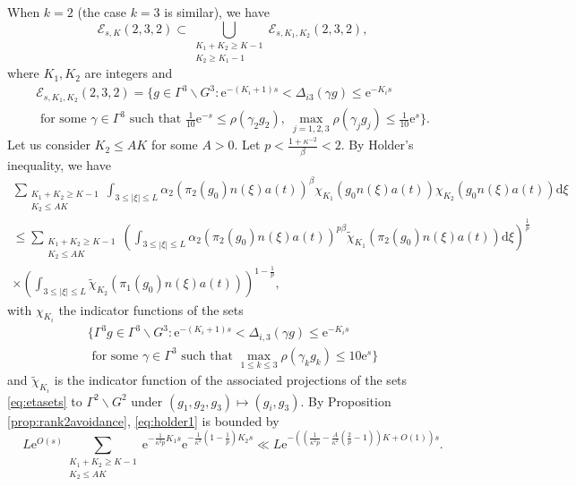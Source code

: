 \documentclass[12pt]{amsart}
\theoremstyle{definition}
\theoremstyle{remark}
\numberwithin{equation}{section}
\newcommand{\dd}{\mathrm{d}}
\newcommand{\e}{\mathrm{e}}
\newcommand{\cE}{\mathcal{E}}
\begin{document}
When $k = 2$ (the case $k=3$ is similar), we have
$$\cE_{s,K}(2,3,2) \subset \bigcup_{\substack{K_1 + K_2 \geq K-1 \\ K_2 \geq K_1 -1}} \cE_{s,K_1,K_2}(2,3,2),$$
where $K_1, K_2$ are integers and
\begin{multline}
  \label{eq:etadef}
  \cE_{s,K_1,K_2}(2,3,2) = \{ g \in \Gamma^3 \backslash G^3 : \e^{-(K_i +1)s} < \Delta_{i3}(\gamma g) \leq \e^{-K_i s} \\
  \textrm{ for some } \gamma \in \Gamma^3 \textrm{ such that } \tfrac{1}{10} \e^{-s}\leq  \rho(\gamma_2 g_2),\ \max_{j=1,2,3} \rho(\gamma_j g_j) \leq \tfrac{1}{10} \e^{s}\}.
\end{multline}
Let us consider $K_2 \leq AK$ for some $A > 0$.
Let $p < \tfrac{1 + \kappa^{-2}}{\beta} < 2$.
By Holder's inequality, we have
\begin{multline}
  \label{eq:holder1}
  \sum_{\substack{K_1 + K_2 \geq K-1 \\ K_2 \leq AK}} \int_{3 \leq |\xi| \leq L} \alpha_2(\pi_2(g_0)n(\xi) a(t))^\beta \chi_{K_1}(g_0n(\xi)a(t)) \chi_{K_2}(g_0n(\xi)a(t)) \dd \xi \\
  \leq \sum_{\substack{K_1 + K_2 \geq K-1 \\ K_2 \leq AK}}\left( \int_{3\leq |\xi| \leq L} \alpha_2(\pi_2(g_0)n(\xi) a(t))^{p \beta} \tilde{\chi}_{K_1} (\pi_2(g_0)n(\xi) a(t))\dd \xi\right)^{\tfrac{1}{p}} \\
  \times \left(\int_{3 \leq |\xi| \leq L} \tilde{\chi}_{K_2}(\pi_1(g_0)n(\xi) a(t))\right)^{1 - \frac{1}{p}},
\end{multline}
with $\chi_{K_i}$ the indicator functions of the sets
\begin{multline}
  \label{eq:etasets}
  \{\Gamma^3 g\in \Gamma^3 \backslash G^3: \e^{-(K_i + 1)s} < \Delta_{i,3}(\gamma g) \leq \e^{-K_i s} \\
  \textrm{ for some } \gamma \in \Gamma^3 \textrm{ such that }
  \max_{1\leq k\leq 3}\rho(\gamma_k g_k)\leq 10 \e^s\}
\end{multline}
and $\tilde \chi_{K_i}$ is the indicator function of the associated projections of the sets \eqref{eq:etasets} to $\Gamma^2 \backslash G^2$ under $(g_1,g_2,g_3) \mapsto (g_i,g_3)$.
By Proposition \ref{prop:rank2avoidance}, \eqref{eq:holder1} is bounded by
\begin{equation}
  \label{eq:dyadicetasum}
  L \e^{O(s)}\sum_{\substack{K_1 + K_2 \geq K-1 \\ K_2 \leq AK}} \e^{-\frac{1}{\kappa^2 p}K_1 s} \e^{-\frac{1}{\kappa^2}(1 - \tfrac{1}{p})K_2 s }
  \ll L\e^{-((\frac{1}{\kappa^2 p} - \frac{A}{\kappa^2} (\frac{2}{p} - 1) )K + O(1))s}.
\end{equation}
\end{document}
